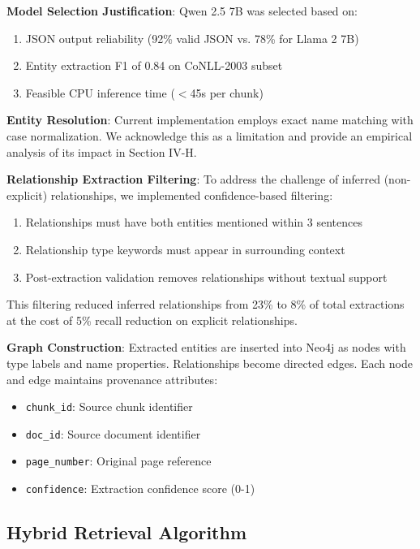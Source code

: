 \documentclass[conference]{IEEEtran}
\begin{document}
\textbf{Model Selection Justification}: Qwen 2.5 7B was selected based on:
\begin{enumerate}
    \item JSON output reliability (92\% valid JSON vs. 78\% for Llama 2 7B)
    \item Entity extraction F1 of 0.84 on CoNLL-2003 subset
    \item Feasible CPU inference time ($<$45s per chunk)
\end{enumerate}

\textbf{Entity Resolution}: Current implementation employs exact name matching with case normalization. We acknowledge this as a limitation and provide an empirical analysis of its impact in Section IV-H.

\textbf{Relationship Extraction Filtering}: To address the challenge of inferred (non-explicit) relationships, we implemented confidence-based filtering:
\begin{enumerate}
    \item Relationships must have both entities mentioned within 3 sentences
    \item Relationship type keywords must appear in surrounding context
    \item Post-extraction validation removes relationships without textual support
\end{enumerate}

This filtering reduced inferred relationships from 23\% to 8\% of total extractions at the cost of 5\% recall reduction on explicit relationships.

\textbf{Graph Construction}: Extracted entities are inserted into Neo4j as nodes with type labels and name properties. Relationships become directed edges. Each node and edge maintains provenance attributes:
\begin{itemize}
    \item \texttt{chunk\_id}: Source chunk identifier
    \item \texttt{doc\_id}: Source document identifier
    \item \texttt{page\_number}: Original page reference
    \item \texttt{confidence}: Extraction confidence score (0-1)
\end{itemize}

\subsection{Hybrid Retrieval Algorithm}
\end{document}
